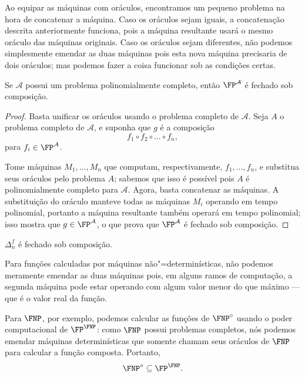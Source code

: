 Ao equipar as máquinas com oráculos,
encontramos um pequeno problema na hora de concatenar a máquina.
Caso os oráculos sejam iguais,
a concatenação descrita anteriormente funciona,
pois a máquina resultante usará o mesmo oráculo das máquinas originais.
Caso os oráculos sejam diferentes,
não podemos simplesmente emendar as duas máquinas
pois esta nova máquina precisaria de dois oráculos;
mas podemos fazer a coisa funcionar sob as condições certas.

\begin{theorem}
    Se $\mathcal A$ possui um problema polinomialmente completo,
    então $\FP^\mathcal A$ é fechado sob composição.
    \label{thm:fp_closed_under_composition}
\end{theorem}

\begin{proof}
    Basta unificar os oráculos usando o problema completo de $\mathcal A$.
    Seja $A$ o problema completo de $\mathcal A$,
    e suponha que $g$ é a composição
    \begin{equation*}
        f_1 \circ f_2 \circ \dots \circ f_n,
    \end{equation*}
    para $f_i \in \FP^\mathcal A$.

    Tome máquinas $M_1, \dots, M_n$ que computam,
    respectivamente, $f_1, \dots, f_n$,
    e substitua seus oráculos pelo problema $A$;
    sabemos que isso é possível pois $A$ é polinomialmente completo para $\mathcal A$.
    Agora,
    basta concatenar as máquinas.
    A substituição do oráculo manteve todas as máquinas $M_i$
    operando em tempo polinomial,
    portanto a máquina resultante também operará em tempo polinomial;
    isso mostra que $g \in \FP^\mathcal A$,
    o que prova que $\FP^\mathcal A$ é fechado sob composição.
\end{proof}

\begin{ucorollary}
    $\Delta_n^f$ é fechado sob composição.
\end{ucorollary}

Para funções calculadas por máquinas não"=determinísticas,
não podemos meramente emendar as duas máquinas
pois,
em alguns ramos de computação,
a segunda máquina pode estar operando com algum valor menor do que máximo
--- que é o valor real da função.

Para $\FNP$, por exemplo,
podemos calcular as funções de $\FNP^\circ$
usando o poder computacional de $\FP^\FNP$:
como $\FNP$ possui problemas completos,
nós podemos emendar máquinas determinísticas
que somente chamam seus oráculos de $\FNP$
para calcular a função composta.
Portanto,
\begin{equation*}
    \FNP^\circ \subseteq \FP^\FNP.
\end{equation*}

